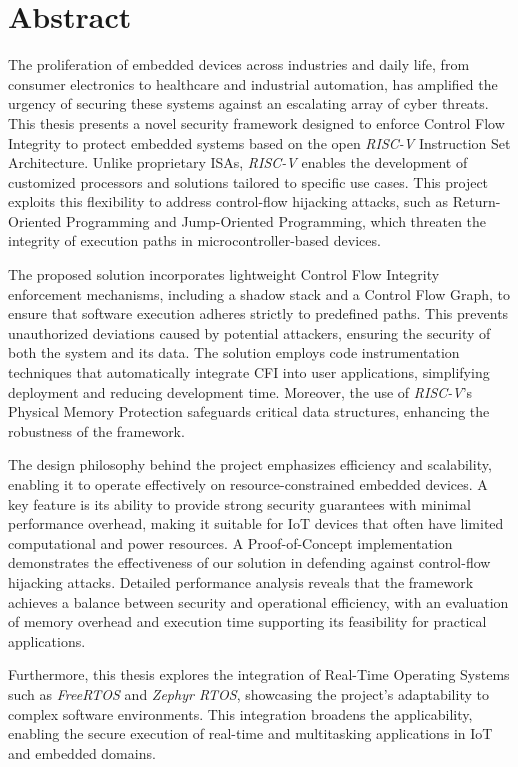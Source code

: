 \chapter*{Abstract}
\label{cha:abtract}

The proliferation of embedded devices across industries and daily life, from consumer
electronics to healthcare and industrial automation, has amplified the urgency
of securing these systems against an escalating array of cyber threats. This thesis
presents a novel security framework designed to enforce Control Flow Integrity to
protect embedded systems based on the open \textit{RISC-V} Instruction Set
Architecture. Unlike proprietary ISAs, \textit{RISC-V} enables the development of
customized processors and solutions tailored to specific use cases. This project
exploits this flexibility to address control-flow hijacking attacks, such as Return-Oriented
Programming and Jump-Oriented Programming, which threaten the integrity of
execution paths in microcontroller-based devices.

The proposed solution incorporates lightweight Control Flow Integrity
enforcement mechanisms, including a shadow stack and a Control Flow Graph, to
ensure that software execution adheres strictly to predefined paths. This prevents
unauthorized deviations caused by potential attackers, ensuring the security of
both the system and its data. The solution employs code instrumentation techniques
that automatically integrate CFI into user applications, simplifying deployment
and reducing development time. Moreover, the use of \textit{RISC-V}'s Physical Memory
Protection safeguards critical data structures, enhancing the robustness of the
framework.

The design philosophy behind the project emphasizes efficiency and scalability, enabling
it to operate effectively on resource-constrained embedded devices. A key
feature is its ability to provide strong security guarantees with minimal
performance overhead, making it suitable for IoT devices that often have limited
computational and power resources. A Proof-of-Concept implementation
demonstrates the effectiveness of our solution in defending against control-flow
hijacking attacks. Detailed performance analysis reveals that the framework achieves
a balance between security and operational efficiency, with an evaluation of
memory overhead and execution time supporting its feasibility for practical
applications.

Furthermore, this thesis explores the integration of Real-Time Operating Systems
such as \textit{FreeRTOS} and \textit{Zephyr RTOS}, showcasing the project's
adaptability to complex software environments. This integration broadens the applicability,
enabling the secure execution of real-time and multitasking applications in IoT
and embedded domains.

